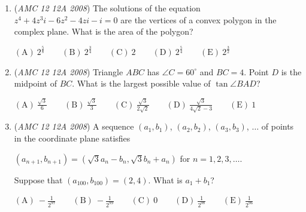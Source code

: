 \begin{enumerate}
	\item (\textit{AMC 12 12A 2008}) The solutions of the equation $z^4+4z^3i-6z^2-4zi-i=0$ are the vertices of a convex polygon in the complex plane. What is the area of the polygon?


 $\mathrm{(A)}\ 2^{\frac{5}{8}}\qquad\mathrm{(B)}\ 2^{\frac{3}{4}}\qquad\mathrm{(C)}\ 2\qquad\mathrm{(D)}\ 2^{\frac{5}{4}}\qquad\mathrm{(E)}\ 2^{\frac{3}{2}}$


	\item (\textit{AMC 12 12A 2008}) Triangle $ABC$ has $\angle C = 60^{\circ}$ and $BC = 4$.  Point $D$ is the midpoint of $BC$.  What is the largest possible value of $\tan{\angle BAD}$?


 $\mathrm{(A)}\ \frac{\sqrt{3}}{6}\qquad\mathrm{(B)}\ \frac{\sqrt{3}}{3}\qquad\mathrm{(C)}\ \frac{\sqrt{3}}{2\sqrt{2}}\qquad\mathrm{(D)}\ \frac{\sqrt{3}}{4\sqrt{2}-3}\qquad\mathrm{(E)}\ 1$


	\item (\textit{AMC 12 12A 2008}) A sequence $(a_1,b_1)$, $(a_2,b_2)$, $(a_3,b_3)$, $\ldots$ of points in the coordinate plane satisfies


 $(a_{n + 1}, b_{n + 1}) = (\sqrt {3}a_n - b_n, \sqrt {3}b_n + a_n)$  for $n = 1,2,3,\ldots$.


 Suppose that $(a_{100},b_{100}) = (2,4)$.  What is $a_1 + b_1$?


 $\mathrm{(A)}\ -\frac{1}{2^{97}}\qquad\mathrm{(B)}\ -\frac{1}{2^{99}}\qquad\mathrm{(C)}\ 0\qquad\mathrm{(D)}\ \frac{1}{2^{98}}\qquad\mathrm{(E)}\ \frac{1}{2^{96}}$


\end{enumerate}